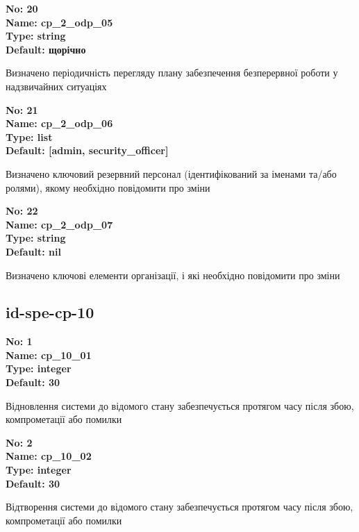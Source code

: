 \documentclass{article}
\begin{document}
{\footnotesize\bfseries
No: 20\\
Name: cp\_\allowbreak{}2\_\allowbreak{}odp\_\allowbreak{}05\\
Type: string\\
Default: \textquotedbl{}щорічно\textquotedbl{}
}

{\footnotesize Визначено періодичність перегляду плану забезпечення безперервної роботи у надзвичайних ситуаціях}


{\footnotesize\bfseries
No: 21\\
Name: cp\_\allowbreak{}2\_\allowbreak{}odp\_\allowbreak{}06\\
Type: list\\
Default: [\textquotedbl{}admin\textquotedbl{}, \textquotedbl{}security\_\allowbreak{}officer\textquotedbl{}]
}

{\footnotesize Визначено ключовий резервний персонал (ідентифікований за іменами та/або ролями), якому необхідно повідомити про зміни}


{\footnotesize\bfseries
No: 22\\
Name: cp\_\allowbreak{}2\_\allowbreak{}odp\_\allowbreak{}07\\
Type: string\\
Default: nil
}

{\footnotesize Визначено ключові елементи організації, і які необхідно повідомити про зміни}




\subsection{id-spe-cp-10}


\vspace{10pt}
{\footnotesize\bfseries
No: 1\\
Name: cp\_\allowbreak{}10\_\allowbreak{}01\\
Type: integer\\
Default: 30
}

{\footnotesize Відновлення системи до відомого стану забезпечується протягом часу після збою, компрометації або помилки}


{\footnotesize\bfseries
No: 2\\
Name: cp\_\allowbreak{}10\_\allowbreak{}02\\
Type: integer\\
Default: 30
}

{\footnotesize Відтворення системи до відомого стану забезпечується протягом часу після збою, компрометації або помилки}
\end{document}
